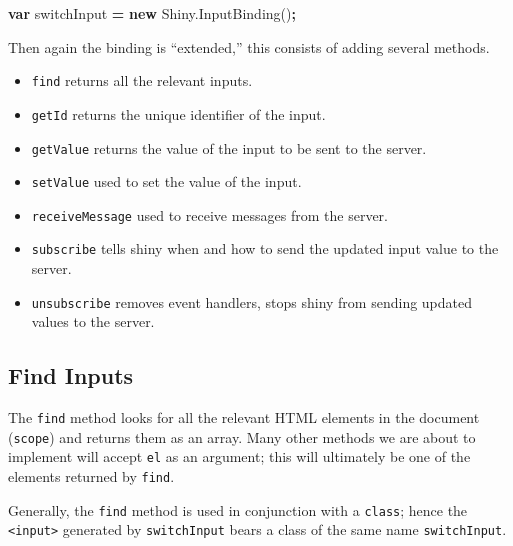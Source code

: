 \documentclass[10pt,]{krantz}
\makeatletter
\newenvironment{Shaded}{\begin{snugshade}}{\end{snugshade}}
\newcommand{\AttributeTok}[1]{\textcolor[rgb]{0.61,0.61,0.61}{#1}}
\newcommand{\CommentTok}[1]{\textcolor[rgb]{0.37,0.37,0.37}{\textit{#1}}}
\newcommand{\ControlFlowTok}[1]{\textcolor[rgb]{0.27,0.27,0.27}{\textbf{#1}}}
\newcommand{\DataTypeTok}[1]{\textcolor[rgb]{0.27,0.27,0.27}{#1}}
\newcommand{\KeywordTok}[1]{\textcolor[rgb]{0.27,0.27,0.27}{\textbf{#1}}}
\newcommand{\NormalTok}[1]{#1}
\newcommand{\OperatorTok}[1]{\textcolor[rgb]{0.43,0.43,0.43}{\textbf{#1}}}
\newcommand{\StringTok}[1]{\textcolor[rgb]{0.5,0.5,0.5}{#1}}
\newcommand{\VariableTok}[1]{\textcolor[rgb]{0,0,0}{#1}}
\providecommand{\tightlist}{%
  \setlength{\itemsep}{0pt}\setlength{\parskip}{0pt}}
\newenvironment{kframe}{%
\medskip{}
\setlength{\fboxsep}{.8em}
 \def\at@end@of@kframe{}%
 \ifinner\ifhmode%
  \def\at@end@of@kframe{\end{minipage}}%
  \begin{minipage}{\columnwidth}%
 \fi\fi%
 \def\FrameCommand##1{\hskip\@totalleftmargin \hskip-\fboxsep
 \colorbox{shadecolor}{##1}\hskip-\fboxsep
     \hskip-\linewidth \hskip-\@totalleftmargin \hskip\columnwidth}%
 \MakeFramed {\advance\hsize-\width
   \@totalleftmargin\z@ \linewidth\hsize
   \@setminipage}}%
 {\par\unskip\endMakeFramed%
 \at@end@of@kframe}
\renewenvironment{Shaded}{\begin{kframe}}{\end{kframe}}
\makeatother
\begin{document}
\begin{Shaded}
\begin{Highlighting}[]
\KeywordTok{var}\NormalTok{ switchInput }\OperatorTok{=} \KeywordTok{new} \VariableTok{Shiny}\NormalTok{.}\AttributeTok{InputBinding}\NormalTok{()}\OperatorTok{;}
\end{Highlighting}
\end{Shaded}

Then again the binding is ``extended,'' this consists of adding several methods.

\begin{itemize}
\tightlist
\item
  \texttt{find} returns all the relevant inputs.
\item
  \texttt{getId} returns the unique identifier of the input.
\item
  \texttt{getValue} returns the value of the input to be sent to the server.
\item
  \texttt{setValue} used to set the value of the input.
\item
  \texttt{receiveMessage} used to receive messages from the server.
\item
  \texttt{subscribe} tells shiny when and how to send the updated input value to the server.
\item
  \texttt{unsubscribe} removes event handlers, stops shiny from sending updated values to the server.
\end{itemize}

\hypertarget{shiny-input-find}{%
\subsection{Find Inputs}\label{shiny-input-find}}

The \texttt{find} method looks for all the relevant HTML elements in the document (\texttt{scope}) and returns them as an array. Many other methods we are about to implement will accept \texttt{el} as an argument; this will ultimately be one of the elements returned by \texttt{find}.

Generally, the \texttt{find} method is used in conjunction with a \texttt{class}; hence the \texttt{\textless{}input\textgreater{}} generated by \texttt{switchInput} bears a class of the same name \texttt{switchInput}.

\begin{Shaded}
\end{Shaded}
\end{document}
